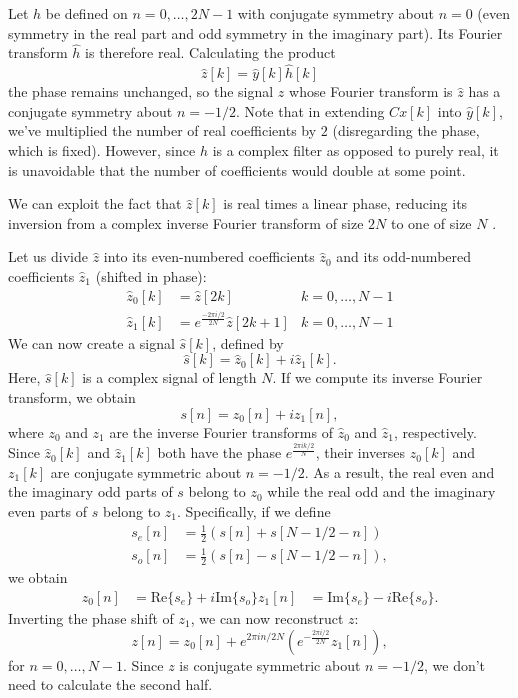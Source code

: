 \documentclass[twocolumn]{article}
\begin{document}
Let $h$ be defined on $n=0,\ldots,2N-1$ with conjugate symmetry about $n=0$ (even symmetry in the real part and odd symmetry in the imaginary part). Its Fourier transform $\hat{h}$ is therefore real. Calculating the product
\[
\hat{z}[k] = \hat{y}[k]\hat{h}[k]
\]
the phase remains unchanged, so the signal $z$ whose Fourier transform is $\hat{z}$ has a conjugate symmetry about $n=-1/2$. Note that in extending $Cx[k]$ into $\hat{y}[k]$, we've multiplied the number of real coefficients by $2$ (disregarding the phase, which is fixed). However, since $h$ is a complex filter as opposed to purely real, it is unavoidable that the number of coefficients would double at some point.

We can exploit the fact that $\hat{z}[k]$ is real times a linear phase, reducing its inversion from a complex inverse Fourier transform of size $2N$ to one of size $N$ \cite{brigham}.

Let us divide $\hat{z}$ into its even-numbered coefficients $\hat{z}_0$ and its odd-numbered coefficients $\hat{z}_1$ (shifted in phase):
\begin{align*}
\hat{z}_0[k] &= \hat{z}[2k] & k=0,\ldots,N-1 \\
\hat{z}_1[k] &= e^{\frac{-2\pi i/2}{2N}}\hat{z}[2k+1] & k=0,\ldots,N-1
\end{align*}
We can now create a signal $\hat{s}[k]$, defined by
\[
\hat{s}[k] = \hat{z}_0[k]+i\hat{z}_1[k].
\]
Here, $\hat{s}[k]$ is a complex signal of length $N$. If we compute its inverse Fourier transform, we obtain
\[
s[n] = z_0[n]+iz_1[n],
\]
where $z_0$ and $z_1$ are the inverse Fourier transforms of $\hat{z}_0$ and $\hat{z}_1$, respectively. Since $\hat{z}_0[k]$ and $\hat{z}_1[k]$ both have the phase $e^{\frac{2\pi i k/2}{N}}$, their inverses $z_0[k]$ and $z_1[k]$ are conjugate symmetric about $n=-1/2$. As a result, the real even and the imaginary odd parts of $s$ belong to $z_0$ while the real odd and the imaginary even parts of $s$ belong to $z_1$. Specifically, if we define
\begin{align*}
s_e[n] &= \frac{1}{2}\left(s[n]+s[N-1/2-n]\right) \\
s_o[n] &= \frac{1}{2}\left(s[n]-s[N-1/2-n]\right),
\end{align*}
we obtain
\begin{align*}
z_0[n] &= \mathrm{Re}\{s_e\}+i\mathrm{Im}\{s_o\}
z_1[n] &= \mathrm{Im}\{s_e\}-i\mathrm{Re}\{s_o\}.
\end{align*}
Inverting the phase shift of $z_1$, we can now reconstruct $z$:
\[
z[n] = z_0[n]+e^{2\pi i n/2N}\left(e^{-\frac{2\pi i/2}{2N}}z_1[n]\right),
\]
for $n=0,\ldots,N-1$. Since $z$ is conjugate symmetric about $n=-1/2$, we don't need to calculate the second half.
\end{document}
